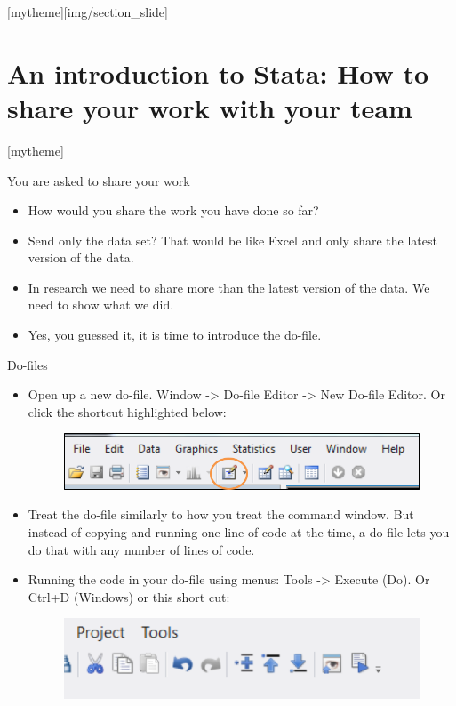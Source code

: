 \documentclass[aspectratio=169]{beamer}
\newcommand{\sectionpic}[2]{
	\setbeamertemplate{section page}[mytheme][#2]
	\section{#1}
	\setbeamertemplate{section page}[mytheme]
}
\begin{document}
\sectionpic{An introduction to Stata: \newline How to share your work with your team}{img/section_slide}

\begin{frame}{You are asked to share your work}
\begin{itemize}
	\item How would you share the work you have done so far?
	\item Send only the data set? That would be like Excel and only share the latest version of the data.
	\item In research we need to share more than the latest version of the data. We need to show what we did.
	\item Yes, you guessed it, it is time to introduce the do-file.	
\end{itemize}
\end{frame}

\begin{frame}{Do-files}
\begin{itemize}
	\item Open up a new do-file. Window -> Do-file Editor -> New Do-file Editor. Or click the shortcut highlighted below:
		\begin{figure}
			\centering
			\includegraphics[width=.6\linewidth]{img/dofilewindow1}
		\end{figure}
	\item Treat the do-file similarly to how you treat the command window. But instead of copying and running one line of code at the time, a do-file lets you do that with any number of lines of code.
	\item Running the code in your do-file using menus: Tools -> Execute (Do). Or Ctrl+D (Windows) or this short cut:
	\begin{figure}
		\centering
		\includegraphics[width=.5\linewidth]{img/dofilewindow2}
	\end{figure}
\end{itemize}
\end{frame}
\end{document}

